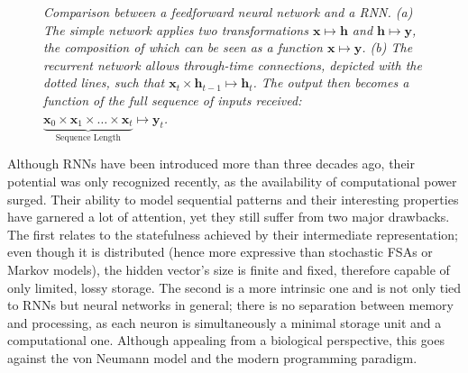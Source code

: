 \documentclass[]{article}
\begin{document}
\begin{figure}
\begin{minipage}{0.5\textwidth}
	\end{minipage}
	\caption[]
	{\small \textit{Comparison between a feedforward neural network and a RNN. (a) The simple network applies two transformations $\pmb{x} \mapsto \pmb{h}$ and $\pmb{h} \mapsto \pmb{y}$, the composition of which can be seen as a function $\pmb{x} \mapsto \pmb{y}$. (b) The recurrent network allows through-time connections, depicted with the dotted lines, such that $\pmb{x}_t \times \pmb{h}_{t-1} \mapsto \pmb{h}_t$. The output then becomes a function of the full sequence of inputs received: $\underbrace{\pmb{x}_0 \times \pmb{x}_1 \times \dots \times \pmb{x}_t}_{\text{Sequence Length}} \mapsto \pmb{y}_t$.}\label{fig:1}}
\end{figure}

Although RNNs have been introduced more than three decades ago, their potential was only recognized recently, as the availability of computational power surged. Their ability to model sequential patterns and their interesting properties have garnered a lot of attention, yet they still suffer from two major drawbacks. The first relates to the statefulness achieved by their intermediate representation; even though it is distributed (hence more expressive than stochastic FSAs or Markov models)\cite[Lecture~10]{Hinton13}, the hidden vector's size is finite and fixed, therefore capable of only limited, lossy storage. The second is a more intrinsic one and is not only tied to RNNs but neural networks in general; there is no separation between memory and processing, as each neuron is simultaneously a minimal storage unit and a computational one. Although appealing from a biological perspective, this goes against the von Neumann model and the modern programming paradigm. 
\end{document}
